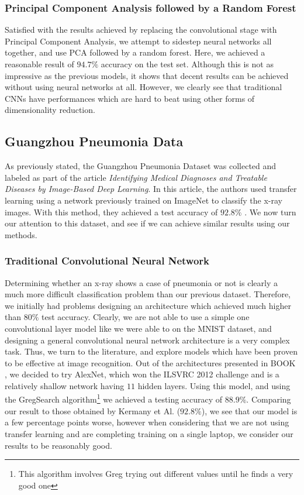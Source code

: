 \documentclass[onecolumn,10pt,cleanfoot]{asme2ej}
\begin{document}
\subsubsection{Principal Component Analysis followed by a Random Forest}

Satisfied with the results achieved by replacing the convolutional stage with Principal Component Analysis, we attempt to sidestep neural networks all together, and use PCA followed by a random forest. Here, we achieved a reasonable result of $94.7\%$ accuracy on the test set. Although this is not as impressive as the previous models, it shows that decent results can be achieved without using neural networks at all. However, we clearly see that traditional CNNs have performances which are hard to beat using other forms of dimensionality reduction.

\subsection{Guangzhou Pneumonia Data}

As previously stated, the Guangzhou Pneumonia Dataset was collected and labeled as part of the article {\it Identifying Medical Diagnoses and Treatable Diseases by Image-Based Deep Learning}. In this article, the authors used transfer learning using a network previously trained on ImageNet to classify the x-ray images. With this method, they achieved a test accuracy of $92.8\%$ \cite[1127]{xray}. We now turn our attention to this dataset, and see if we can achieve similar results using our methods.

\subsubsection{Traditional Convolutional Neural Network}

Determining whether an x-ray shows a case of pneumonia or not is clearly a much more difficult classification problem than our previous dataset. Therefore, we initially had problems designing an architecture which achieved much higher than $80\%$ test accuracy. Clearly, we are not able to use a simple one convolutional layer model like we were able to on the MNIST dataset, and designing a general convolutional neural network architecture is a very complex task. Thus, we turn to the literature, and explore models which have been proven to be effective at image recognition. Out of the architectures presented in BOOK \cite{geron}, we decided to try AlexNet, which won the ILSVRC 2012 challenge and is a relatively shallow network having $11$ hidden layers. Using this model, and using the GregSearch algorithm\footnote{This algorithm involves Greg trying out different values until he finds a very good one} we achieved a testing accuracy of $88.9\%$. Comparing our result to those obtained by Kermany et Al. ($92.8\%$), we see that our model is a few percentage points worse, however when considering that we are not using transfer learning and are completing training on a single laptop, we consider our results to be reasonably good.
\end{document}
